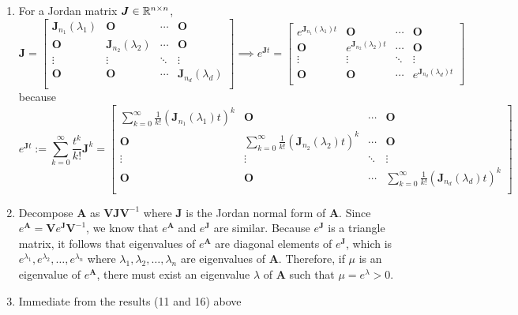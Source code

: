 \documentclass[12pt,a4paper]{article}
\begin{document}
\begin{itemize}
\begin{enumerate}
    \item For a Jordan matrix $\bm{J}\in \mathbb{R}^{n\times n}$,
    \begin{equation}\nonumber%
      \bm{J} =
      \begin{bmatrix}
        \bm{J}_{n_{1}}(\lambda_{1}) & \bm{O} & \cdots & \bm{O} \\
        \bm{O} & \bm{J}_{n_{2}}(\lambda_{2}) & \cdots & \bm{O} \\
        \vdots & \vdots & \ddots & \vdots \\
        \bm{O} & \bm{O} & \cdots & \bm{J}_{n_{d}}(\lambda_{d}) \\
      \end{bmatrix}
      \implies
      e^{\bm{J}t}
      =
      \begin{bmatrix}
        e^{\bm{J}_{n_{1}}(\lambda_{1})t} & \bm{O} & \cdots & \bm{O} \\
        \bm{O} & e^{\bm{J}_{n_{2}}(\lambda_{2})t} & \cdots & \bm{O} \\
        \vdots & \vdots & \ddots & \vdots \\
        \bm{O} & \bm{O} & \cdots & e^{\bm{J}_{n_{d}}(\lambda_{d})t} \\
      \end{bmatrix}
    \end{equation}
    because
    \begin{equation}\nonumber%
      e^{\bm{J}t}
      := \sum_{k=0}^{\infty}\frac{t^{k}}{k!}\bm{J}^{k}
      =      
      \begin{bmatrix}
        \sum_{k=0}^{\infty}\frac{1}{k!}(\bm{J}_{n_{1}}(\lambda_{1})t)^{k} & \bm{O} & \cdots & \bm{O} \\
        \bm{O} & \sum_{k=0}^{\infty}\frac{1}{k!}(\bm{J}_{n_{2}}(\lambda_{2})t)^{k} & \cdots & \bm{O} \\
        \vdots & \vdots & \ddots & \vdots \\
        \bm{O} & \bm{O} & \cdots & \sum_{k=0}^{\infty}\frac{1}{k!}(\bm{J}_{n_{d}}(\lambda_{d})t)^{k} \\
      \end{bmatrix}
    \end{equation}
    
  \item Decompose $\bm{A}$ as $\bm{V}\bm{J}\bm{V}^{-1}$
    where $\bm{J}$ is the Jordan normal form of $\bm{A}$.
    Since $e^{\bm{A}} = \bm{V}e^{\bm{J}}\bm{V}^{-1}$,
    we know that $e^{\bm{A}}$ and $e^{\bm{J}}$ are similar.
    Because $e^{\bm{J}}$ is a triangle matrix,
    it follows that eigenvalues of $e^{\bm{A}}$ are diagonal elements of $e^{\bm{J}}$,
    which is $e^{\lambda_{1}}, e^{\lambda_{2}}, \ldots, e^{\lambda_{n}}$
    where $\lambda_{1}, \lambda_{2}, \ldots, \lambda_{n}$ are eigenvalues of $\bm{A}$.
    Therefore, if $\mu$ is an eigenvalue of $e^{\bm{A}}$,
    there must exist an eigenvalue $\lambda$ of $\bm{A}$ such that $\mu = e^{\lambda}>0$.

  \item Immediate from the results (11 and 16) above

  \end{enumerate}
\end{itemize}
\end{document}
